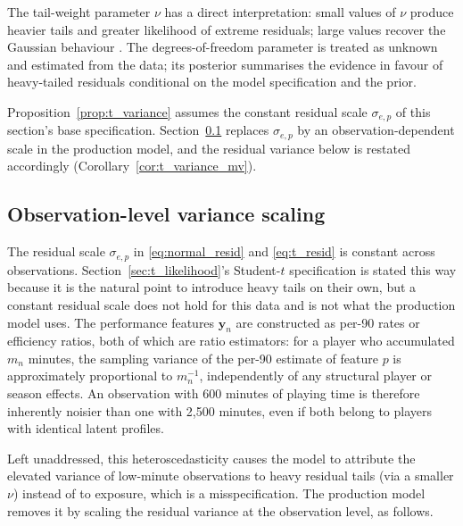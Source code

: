 The tail-weight parameter $\nu$ has a direct interpretation: small values of $\nu$ produce heavier tails and greater likelihood of extreme residuals; large values recover the Gaussian behaviour \cite{lange1989robust,geweke1993bayesian}. The degrees-of-freedom parameter is treated as unknown and estimated from the data; its posterior summarises the evidence in favour of heavy-tailed residuals conditional on the model specification and the prior.

Proposition~\ref{prop:t_variance} assumes the constant residual scale $\sigma_{e,p}$ of this section's base specification. Section~\ref{sec:phi} replaces $\sigma_{e,p}$ by an observation-dependent scale in the production model, and the residual variance below is restated accordingly (Corollary~\ref{cor:t_variance_mv}).

\subsection{Observation-level variance scaling}
\label{sec:phi}

The residual scale $\sigma_{e,p}$ in \eqref{eq:normal_resid} and \eqref{eq:t_resid} is constant across observations. Section~\ref{sec:t_likelihood}'s Student-$t$ specification is stated this way because it is the natural point to introduce heavy tails on their own, but a constant residual scale does not hold for this data and is not what the production model uses. The performance features $\mathbf{y}_n$ are constructed as per-90 rates or efficiency ratios, both of which are ratio estimators: for a player who accumulated $m_n$ minutes, the sampling variance of the per-90 estimate of feature $p$ is approximately proportional to $m_n^{-1}$, independently of any structural player or season effects. An observation with 600 minutes of playing time is therefore inherently noisier than one with 2{,}500 minutes, even if both belong to players with identical latent profiles.

Left unaddressed, this heteroscedasticity causes the model to attribute the elevated variance of low-minute observations to heavy residual tails (via a smaller $\nu$) instead of to exposure, which is a misspecification. The production model removes it by scaling the residual variance at the observation level, as follows.

